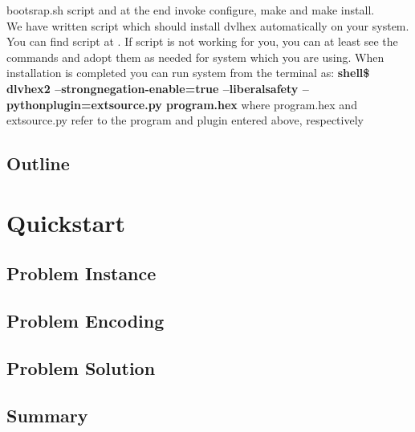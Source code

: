 \documentclass[14pt,a4paper, titlepage]{article}
\begin{document}
bootsrap.sh script and at the end invoke configure, make and make install.\bigskip \\We have written script which should install dvlhex automatically on your system. You can find script at \cite{script}. If script is not working for you, you can at least see the commands and adopt them as needed for system which you are using. When installation is completed you can run system from the terminal as: 
\textbf{shell\$ dlvhex2 --strongnegation-enable=true --liberalsafety --pythonplugin=extsource.py program.hex}
where program.hex and extsource.py refer to the program and plugin entered above, respectively    

          

    
\subsection{Outline}


\section{Quickstart} %
\subsection{Problem Instance}
\subsection{Problem Encoding}
\subsection{Problem Solution}
\subsection{Summary}
\end{document}
